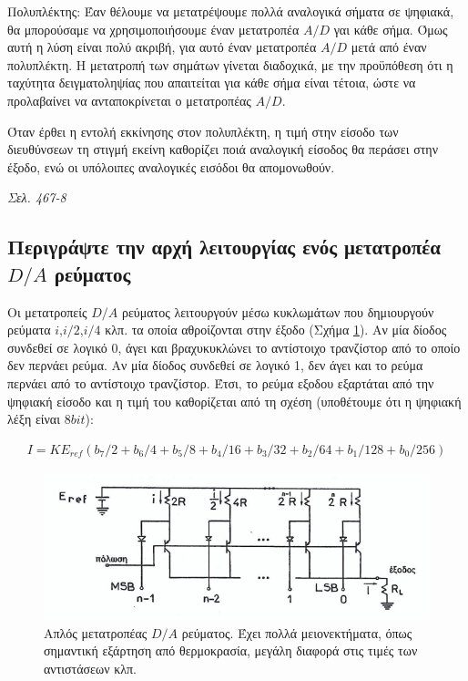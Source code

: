 \documentclass{article}
\begin{document}
Πολυπλέκτης: Έαν θέλουμε να μετατρέψουμε πολλά αναλογικά σήματα σε ψηφιακά, θα μπορούσαμε να χρησιμοποιήσουμε έναν μετατροπέα $A/D$ γαι κάθε σήμα. Όμως αυτή η λύση είναι
πολύ ακριβή, για αυτό έναν μετατροπέα $A/D$ μετά από έναν πολυπλέκτη. Η μετατροπή των σημάτων γίνεται διαδοχικά, με την προϋπόθεση ότι η ταχύτητα δειγματοληψίας που
απαιτείται για κάθε σήμα είναι τέτοια, ώστε να προλαβαίνει να ανταποκρίνεται ο μετατροπέας $Α/D$.

Όταν έρθει η εντολή εκκίνησης στον πολυπλέκτη, η τιμή στην είσοδο των διευθύνσεων τη στιγμή εκείνη καθορίζει ποιά αναλογική είσοδος θα περάσει στην έξοδο, ενώ οι 
υπόλοιπες αναλογικές εισόδοι θα απομονωθούν.

\emph{Σελ. 467-8}

\subsection{Περιγράψτε την αρχή λειτουργίας ενός μετατροπέα $D/A$ ρεύματος}
Οι μετατροπείς $D/A$ ρεύματος λειτουργούν μέσω κυκλωμάτων που δημιουργούν ρεύματα $i$,$i/2$,$i/4$ κλπ. τα οποία αθροίζονται στην έξοδο (Σχήμα \ref{DArevmatos}). Αν μία δίοδος συνδεθεί σε λογικό 0, άγει και 
βραχυκυκλώνει το αντίστοιχο τρανζίστορ από το οποίο δεν περνάει ρεύμα. Αν μία δίοδος συνδεθεί σε λογικό 1, δεν άγει και το ρεύμα περνάει από το αντίστοιχο τρανζίστορ. Έτσι, το 
ρεύμα εξοδου εξαρτάται από την ψηφιακή είσοδο και η τιμή του καθορίζεται από τη σχέση (υποθέτουμε ότι η ψηφιακή λέξη είναι $8 bit$):

\begin{align*}
    I = K E_{ref} \left( b_7/2 + b_6/4 + b_5/8 + b_4/16 +b_3/32 + b_2/64 + b_1/128 + b_0/256 \right)
\end{align*}

\begin{figure}[h!]
    \includegraphics[width=\linewidth]{DArevma.png}
    \caption{Απλός μετατροπέας $D/A$ ρεύματος. Έχει πολλά μειονεκτήματα, όπως σημαντική εξάρτηση από θερμοκρασία, μεγάλη διαφορά στις τιμές των αντιστάσεων κλπ.}
    \label{DArevmatos}
\end{figure}
\end{document}
